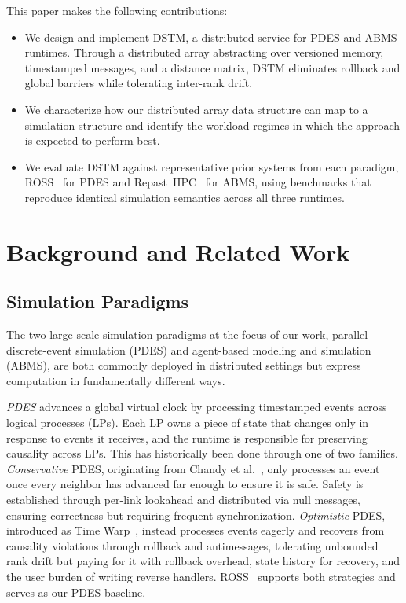 This paper makes the following contributions:
\begin{itemize}
  \item We design and implement DSTM, a distributed service
        for PDES and ABMS runtimes. Through a distributed array abstracting over versioned memory, timestamped messages,
        and a distance matrix, DSTM eliminates rollback and global barriers while
        tolerating inter-rank drift.
  \item We characterize how our distributed array data structure
        can map to a simulation structure and identify the workload regimes in which
        the approach is expected to perform best. %
        
  \item We evaluate DSTM against representative prior systems
        from each paradigm, ROSS~\cite{ross, ross-recent} for
        PDES and Repast~HPC~\cite{repast-hpc} for ABMS, using
        benchmarks that reproduce identical simulation semantics
        across all three runtimes.
\end{itemize}

\section{Background and Related Work}
\label{sec:background}

\subsection{Simulation Paradigms}

The two large-scale simulation paradigms at the focus of our
work, parallel discrete-event simulation (PDES) and agent-based
modeling and simulation (ABMS), are both commonly deployed in
distributed settings but express computation in fundamentally
different ways.

\emph{PDES} advances a global virtual clock by processing
timestamped events across logical processes (LPs). Each LP owns
a piece of state that changes only in response to events it
receives, and the runtime is responsible for preserving causality
across LPs. This has historically been done through one of two
families. \emph{Conservative} PDES, originating from Chandy et
al.~\cite{chandy-misra}, only processes an event once every
neighbor has advanced far enough to ensure it is safe. Safety is
established through per-link lookahead and distributed via null
messages, ensuring correctness but requiring frequent synchronization. 
\emph{Optimistic} PDES, introduced as Time
Warp~\cite{Time-Warp}, instead processes events eagerly and
recovers from causality violations through rollback and
antimessages, tolerating unbounded rank drift but paying for it
with rollback overhead, state history for recovery, and the user
burden of writing reverse handlers. ROSS~\cite{ross, ross-recent}
supports both strategies and serves as our PDES baseline.

